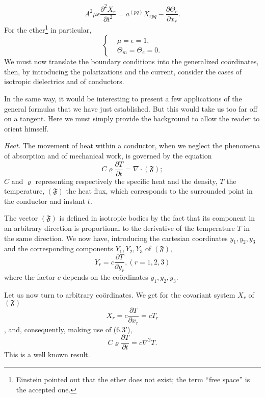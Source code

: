 \documentclass{book}
\begin{document}
\begin{equation*}
A^2\mu\epsilon\frac{\partial^2X_r}{\partial t^2}=a^{(pq)}X_{rpq}-\frac{\partial\Theta_e}{\partial x_r}.
\tag{6.7''}
\end{equation*}
For the ether\footnote{Einstein pointed out that the ether does not exist; the term ``free space'' is the accepted one.} in particular,
\begin{equation*}
\begin{cases}
&\mu=\epsilon=1,\\
&\Theta_m=\Theta_e=0.
\end{cases}
\end{equation*}
We must now translate the boundary conditions into the generalized co\"ordinates, then, by introducing the polarizations and the current, consider the cases of isotropic dielectrics and of conductors.

In the same way, it would be interesting to present a few applications of the general formulas that we have just established. But this would take us too far off on a tangent. Here we must simply provide the background to allow the reader to orient himself.

\emph{Heat.} The movement of heat within a conductor, when we neglect the phenomena of absorption and of mechanical work, is governed by the equation
\begin{equation}
C\varrho\frac{\partial T}{\partial t}=\nabla\cdot(\mathfrak{F});
\end{equation}
$C$ and $\varrho$ representing respectively the specific heat and the density, $T$ the temperature, $(\mathfrak{F})$ the heat flux, which corresponds to the surrounded point in the conductor and instant $t$.

The vector $(\mathfrak{F})$ is defined in isotropic bodies by the fact that its component in an arbitrary direction is proportional to the derivative of the temperature $T$ in the same direction. We now have, introducing the cartesian coordinates $y_1,y_2,y_3$ and the corresponding components $Y_1,Y_2,Y_3$ of $(\mathfrak{F}),$
\begin{equation}
Y_r=c\frac{\partial T}{\partial y_r}, (r=1,2,3)
\end{equation}
where the factor $c$ depends on the co\"ordinates $y_1,y_2,y_3$.

Let us now turn to arbitrary co\"ordinates. We get for the covariant system $X_r$ of $(\mathfrak{F})$
$$X_r=c\frac{\partial T}{\partial x_r}=cT_r$$,
and, consequently, making use of (6.3'),
\begin{equation*}
C\varrho\frac{\partial T}{\partial t}=c\nabla^2T.
\tag{6.8'}
\end{equation*}
This is a well known result.
\end{document}
